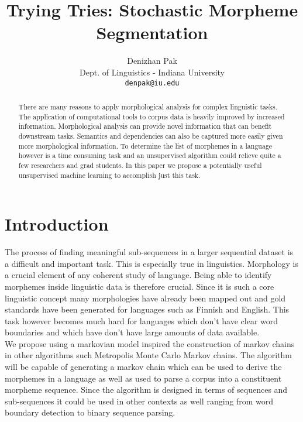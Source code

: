 \documentclass[11pt,a4paper]{article}
\title{Trying Tries: Stochastic Morpheme Segmentation}
\author{Denizhan Pak \\
  Dept. of Linguistics - Indiana University \\
  {\tt denpak@iu.edu} \\}
\date{}
\begin{document}
\maketitle
\begin{abstract}
        There are many reasons to apply morphological analysis for complex 
        linguistic tasks. The application of computational tools to
        corpus data is heavily improved by increased information. 
        Morphological analysis can provide novel information that can 
        benefit downstream tasks. Semantics and dependencies can also be
        captured more easily given more morphological information.
        To determine the list of morphemes in a language however is a time
        consuming task and an unsupervised algorithm could relieve quite a few
        researchers and grad students. In this paper we propose a 
        potentially useful unsupervised machine learning to accomplish 
        just this task.
\end{abstract}

\section{Introduction}

    The process of finding meaningful sub-sequences in a larger sequential 
    dataset is a difficult and important task. This is especially true in 
    linguistics. Morphology is a crucial element of any coherent study of 
    language. Being able to identify morphemes inside linguistic data is 
    therefore crucial. Since it is such a core linguistic concept many 
    morphologies have already been mapped out and gold standards have been
    generated for languages such as Finnish and English. This task however 
    becomes much hard for languages which don't have clear word boundaries 
    and which have don't have large amounts of data available.\\
    We propose using a markovian model inspired the construction of markov
    chains in other algorithms such Metropolis Monte Carlo Markov chains.
    The algorithm will be capable of generating a markov chain which can be
    used to derive the morphemes in a language as well as used to parse a
    corpus into a constituent morpheme sequence. Since the algorithm is 
    designed in terms of sequences and sub-sequences it could be used in other
    contexts as well ranging from word boundary detection to binary sequence 
    parsing.
\end{document}
